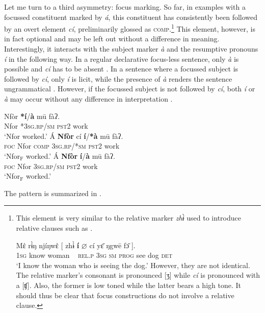 \documentclass[output=paper]{langscibook}
\begin{document}
Let me turn to a third asymmetry: focus marking. So far, in examples
with a focussed constituent marked by \textit{á}, this constituent
has consistently been followed by an overt element \textit{cí},
preliminarily glossed as \textsc{comp}.\footnote{This element is very similar to the relative marker \textit{zhɨ̀} used to introduce relative clauses such as .

\ea \label{ex:johanneshein:relC}
\gll Mὲ rɨ̀ŋ njíŋwὲ [ zhɨ̀ \textbf{í} $\varnothing$ cí yɛ̄ ŋgwē fɔ̄ ].\\
\textsc{1sg} know woman ~ \textsc{rel.p} \textsc{3sg} \textsc{sm} \textsc{prog} see dog \textsc{det}\\
\glt `I know the woman who is seeing the dog.'
\z
However, they are not identical. The relative marker's consonant is pronounced [ʒ] while \textit{cí} is pronounced with a [ʧ]. Also, the former is low toned while the latter bears a high tone. It should thus be clear that focus constructions do not involve a relative clause.
}  This element, however, is in
fact optional and may be left out without a difference in meaning. Interestingly, it interacts with the subject marker
\textit{à} and the resumptive pronouns \textit{í} in the following way. In a regular
declarative focus-less sentence, only \textit{à} is possible and
\textit{cí} has to be absent . In a sentence where a
focussed subject is followed by \textit{cí}, only \textit{í} is
licit, while the presence of \textit{à} renders the sentence
ungrammatical .  However, if the focussed subject is not
followed by \textit{cí}, both \textit{í} or \textit{à} may occur without any difference in interpretation
 \citep[for the interpretation of focus in Limbum also see][]{driemel+nformi18,beckeretal19}.

\ea
\begin{xlist}
\ex \label{ex:johanneshein:nofocus}
\gll Nfòr \textbf{*í}/\textbf{à} mū fàʔ.\\
Nfor \textsc{*3sg.rp/sm} \textsc{pst2} work\\
\glt `Nfor worked.'
\ex  \label{ex:johanneshein:exsitufocus}
\gll Á \textbf{Nfòr} cí \textbf{í}/\textbf{*à} mū fàʔ.\\
\textsc{foc} Nfor \textsc{comp} \textsc{3sg.rp/*sm} \textsc{pst2} work\\
\glt `Nfor$_{\text{F}}$ worked.'
\ex \label{ex:johanneshein:insitufocus}
\gll Á \textbf{Nfòr} \textbf{í}/\textbf{à} mū fàʔ.\\
\textsc{foc} Nfor \textsc{3sg.rp/sm} \textsc{pst2} work\\
\glt `Nfor$_{\text{F}}$ worked.'
\end{xlist}
\z
The pattern is summarized in .
\end{document}
